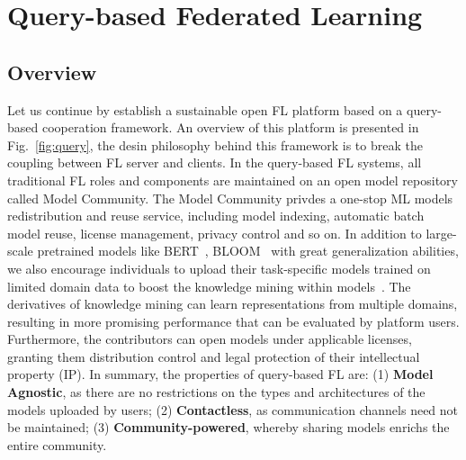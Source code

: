 \section{Query-based Federated Learning}
\label{sec:query}
\subsection{Overview}
\label{sec:query_overview}
Let us continue by establish a sustainable open FL platform based on a query-based cooperation framework.
An overview of this platform is presented in Fig.~\ref{fig:query}, the desin philosophy behind this framework is to break the coupling between FL server and clients.
In the query-based FL systems, all traditional FL roles and components are maintained on an open model repository called Model Community. The Model Community privdes a one-stop ML models redistribution and reuse service, including model indexing, automatic batch model reuse, license management, privacy control and so on.
In addition to large-scale pretrained models like BERT~\cite{devlin2018bert}, BLOOM~\cite{scao2022bloom} with great generalization abilities, we also encourage individuals to upload their task-specific models trained on limited domain data to boost the knowledge mining within models~\cite{you2021workshop}.
The derivatives of knowledge mining can learn representations from multiple domains, resulting in more promising performance that can be evaluated by platform users.
Furthermore, the contributors can open models under applicable licenses, granting them distribution control and legal protection of their intellectual property (IP).
In summary, the properties of query-based FL are:
(1) \textbf{Model Agnostic}, as there are no restrictions on the types and architectures of the models uploaded by users;
(2) \textbf{Contactless}, as communication channels need not be maintained; 
(3) \textbf{Community-powered}, whereby sharing models enrichs the entire community.

